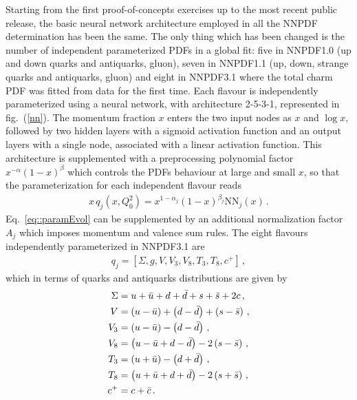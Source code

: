%
Starting from the first proof-of-concepts exercises up to the most recent public release, the basic
neural network architecture employed in all the NNPDF determination has been the same.
The only thing which has been changed is the number of independent parameterized PDFs in a global fit:
five in NNPDF1.0 (up and down quarks and antiquarks, gluon), 
seven in NNPDF1.1 (up, down, strange quarks and antiquarks, gluon) and eight in NNPDF3.1
where the total charm PDF was fitted from data for the first time.
Each flavour is independently parameterized using a neural network,
with architecture 2-5-3-1, represented in fig.~(\ref{nn}). 
The momentum fraction $x$ enters the two input nodes as $x$ and $\log{x}$, followed by two hidden layers with a sigmoid activation function and an output layers with a single node, 
associated with a linear activation function. 
This architecture is supplemented with a preprocessing polynomial factor $x^{-\alpha}\left(1-x\right)^{\beta}$ which controls the PDFs behaviour
at large and small $x$, so that the parameterization for each independent flavour reads
\begin{align}
	\label{eq::paramEvol}
	x\,q_j\left(x, Q_0^2\right) = x^{1-\alpha_{j}}\left(1-x\right)^{\beta_{j}}\text{NN}_{j}\left(x\right)\,.
\end{align}
Eq.~\eqref{eq::paramEvol} can be supplemented by an additional normalization factor $A_j$ which imposes momentum
and valence sum rules. The eight flavours independently parameterized in NNPDF3.1 are 
\begin{align}
    \label{eq:nnpdf31IC_basis}
    q_j = \left[\Sigma, g, V, V_3, V_8, T_3, T_8, c^+ \right]\,,
\end{align} 
which in terms of quarks and antiquarks distributions are given by
\begin{align}
    \label{eq:evol_def}
    \Sigma  &=  u+\bar{u} + d+\bar{d} + s+\bar{s} + 2c  \, ,  \nonumber \\
    V     &= \left( u-\bar{u}\right) + \left( d-\bar{d}\right) + \left( s-\bar{s}\right)   \, ,\nonumber \\
    V_3     &=  \left( u-\bar{u}\right) - \left(  d-\bar{d}  \right) \, , \nonumber\\
    V_8     &=  \left( u-\bar{u} +  d-\bar{d}  \right) - 2\left( s-\bar{s} \right) \,,\\
    T_3     &=  \left( u+\bar{u}\right) - \left(  d+\bar{d}  \right) \, ,  \nonumber\\
    T_8     &=  \left( u+\bar{u} +  d+\bar{d}  \right) - 2\left( s+\bar{s} \right) \, , \nonumber\\
    c^+ &= c +\bar{c}\,. \nonumber
  \end{align}

